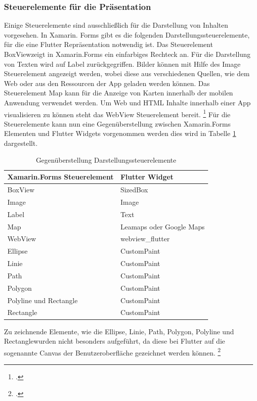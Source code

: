\subsubsection{Steuerelemente für die Präsentation}
Einige Steuerelemente sind ausschließlich für die Darstellung von Inhalten vorgesehen.  In Xamarin. Forms gibt es die folgenden  Darstellungssteuerelemente, für die eine Flutter Repräsentation notwendig ist.  Das Steuerelement \glq BoxView\grq{ }zeigt in Xamarin.Forms ein einfarbiges Rechteck an.  Für die Darstellung von Texten wird auf \glq Label\grq{} zurückgegriffen.  Bilder können mit Hilfe des \glq Image\grq{}  Steuerelement angezeigt werden,  wobei diese aus verschiedenen Quellen, wie dem Web oder aus den Ressourcen der App geladen werden können.  Das Steuerelement \glq Map\grq{}  kann für die Anzeige von Karten innerhalb der mobilen Anwendung verwendet werden.  Um Web und HTML Inhalte innerhalb einer App visualisieren zu können steht das \glq WebView\grq{}  Steuerelement bereit.  \footcite[Vgl.][Abgerufen am \today]{MicrosoftXamLayouts2018} Für die Steuerelemente kann nun eine Gegenüberstellung zwischen Xamarin.Forms Elementen und Flutter Widgets vorgenommen werden dies wird in Tabelle \ref{tab:ControlsVisualization} dargestellt.

\begin{table}[!ht]
\begin{tabularx}{\textwidth}{X|X}
   \textbf{Xamarin.Forms Steuerelement} & \textbf{Flutter Widget}  \\
\hline
	BoxView		       			&   	 SizedBox  		\\ 
	Image       						&	     Image	 			\\ 
	Label       						&  	Text 					\\ 
	Map            					&	   	Leamaps oder Google Maps \\ 
	WebView            			&  	webview\_flutter	\\ 
	Ellipse							&  	CustomPaint	\\ 
	Linie								&	  	CustomPaint	\\ 
	Path  							&  	CustomPaint	\\ 
	Polygon  						&  	CustomPaint	\\ 
	Polyline und Rectangle  &  	CustomPaint	\\ 
	Rectangle  					&  	CustomPaint	\\ 

\end{tabularx}
\caption{Gegenüberstellung Darstellungssteuerelemente}
 \label{tab:ControlsVisualization}
\end{table}
Zu zeichnende Elemente, wie die  \glq Ellipse\grq{}, \glq Linie\grq{}, \glq Path\grq{},  \glq Polygon\grq{},  \glq Polyline\grq{}  und \glq Rectangle\grq{}wurden nicht besonders aufgeführt,  da diese bei Flutter auf die sogenannte Canvas der Benutzeroberfläche gezeichnet werden können.  \footcite[Vgl.][Abgerufen am \today]{GoogleFlutterCanvas2020} 


